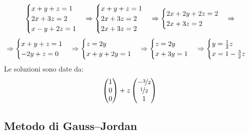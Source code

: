 \begin{example}
  $$
    \begin{cases}
      x+y+z=1  \\
      2x+3z=2  \\
      x-y+2z=1 \\
    \end{cases}
    \Rightarrow
    \begin{cases}
      x+y+z=1 \\
      2x+3z=2 \\
      2x+3z=2 \\
    \end{cases}
    \Rightarrow
    \begin{cases}
      2x+2y+2z=2 \\
      2x+3z=2    \\
    \end{cases}
    \Rightarrow
  $$
  $$
    \Rightarrow
    \begin{cases}
      x+y+z=1 \\
      -2y+z=0 \\
    \end{cases}
    \Rightarrow
    \begin{cases}
      z=2y     \\
      x+y+2y=1 \\
    \end{cases}
    \Rightarrow
    \begin{cases}
      z=2y   \\
      x+3y=1 \\
    \end{cases}
    \Rightarrow
    \begin{cases}
      y=\frac{1}{2}z   \\
      x=1-\frac{3}{2}z \\
    \end{cases}
  $$
  Le soluzioni sono date da:
  $$
    \begin{pmatrix}
      1 \\
      0 \\
      0
    \end{pmatrix}
    +
    z
    \begin{pmatrix}
      -\nicefrac{3}{2} \\
      \nicefrac{1}{2}  \\
      1                \\
    \end{pmatrix}
  $$
\end{example}

\subsection{Metodo di Gauss--Jordan}

